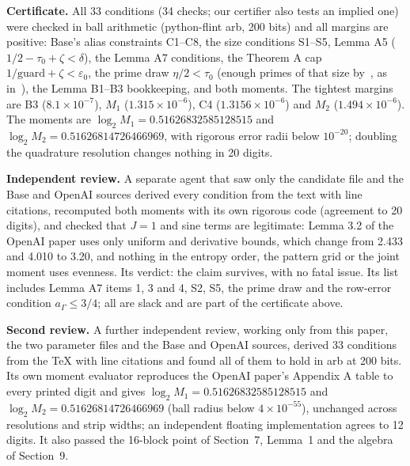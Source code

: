 \documentclass[11pt]{article}
\newcommand{\eps}{\varepsilon}
\theoremstyle{plain}
\begin{document}
\textbf{Certificate.} All 33 conditions (34 checks; our certifier also tests an implied one) were checked in ball arithmetic (python-flint arb, 200 bits) and all margins are positive: Base's alias constraints C1--C8, the size conditions S1--S5, Lemma A5 ($1/2 - \tau_0 + \zeta < \delta$), the Lemma A7 conditions, the Theorem A cap $1/\mathrm{guard} + \zeta < \eps_0$, the prime draw $\eta/2 < \tau_0$ (enough primes of that size by~\cite[Cor.~3]{rs}, as in~\cite{openai}), the Lemma B1--B3 bookkeeping, and both moments. The tightest margins are B3 ($8.1\times10^{-7}$), $M_1$ ($1.315\times10^{-6}$), C4 ($1.3156\times10^{-6}$) and $M_2$ ($1.494\times10^{-6}$). The moments are $\log_2 M_1 = 0.51626832585128515$ and $\log_2 M_2 = 0.51626814726466969$, with rigorous error radii below $10^{-20}$; doubling the quadrature resolution changes nothing in 20 digits.

\textbf{Independent review.} A separate agent that saw only the candidate file and the Base and OpenAI sources derived every condition from the text with line citations, recomputed both moments with its own rigorous code (agreement to 20 digits), and checked that $J = 1$ and sine terms are legitimate: Lemma 3.2 of the OpenAI paper uses only uniform and derivative bounds, which change from 2.433 and 4.010 to 3.20, and nothing in the entropy order, the pattern grid or the joint moment uses evenness. Its verdict: the claim survives, with no fatal issue. Its list includes Lemma A7 items 1, 3 and 4, S2, S5, the prime draw and the row-error condition $a_\Gamma \le 3/4$; all are slack and are part of the certificate above.

\textbf{Second review.} A further independent review, working only from this paper, the two parameter files and the Base and OpenAI sources, derived 33 conditions from the TeX with line citations and found all of them to hold in arb at 200 bits. Its own moment evaluator reproduces the OpenAI paper's Appendix A table to every printed digit and gives $\log_2 M_1 = 0.51626832585128515$ and $\log_2 M_2 = 0.51626814726466969$ (ball radius below $4\times10^{-55}$), unchanged across resolutions and strip widths; an independent floating implementation agrees to 12 digits. It also passed the 16-block point of Section~7, Lemma~1 and the algebra of Section~9.
\end{document}
